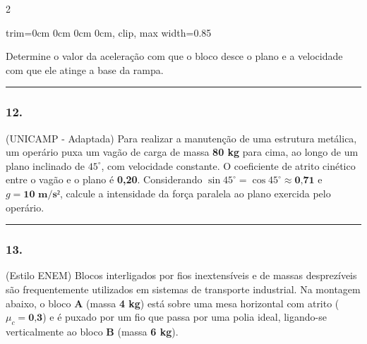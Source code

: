 \documentclass[twoside, 10pt, a4paper]{article}
\newlength{\espacoPreQuestao}\setlength{\espacoPreQuestao}{0.1cm}
\newlength{\espacoQuestao}\setlength{\espacoQuestao}{0.2cm}
\newcommand{\larguraTikz}{0.85\linewidth}
\begin{document}
\begin{multicols*}{2}
\begin{center}
\begin{adjustbox}{trim=0cm 0cm 0cm 0cm, clip, max width=\larguraTikz}
\end{adjustbox}
\end{center}

Determine o valor da aceleração com que o bloco desce o plano e a velocidade com que ele atinge a base da rampa.
\par\vspace{\espacoQuestao}

\noindent\textcolor{CorLinha}{\rule{\linewidth}{0.5pt}} 
\par\vspace{\espacoPreQuestao}
\subsubsection*{12.} (UNICAMP - Adaptada) Para realizar a manutenção de uma estrutura metálica, um operário puxa um vagão de carga de massa \textbf{80 kg} para cima, ao longo de um plano inclinado de $45^\circ$, com velocidade constante. O coeficiente de atrito cinético entre o vagão e o plano é \textbf{0,20}. Considerando $\sin 45^\circ = \cos 45^\circ \approx \textbf{0,71}$ e $g = \textbf{10 m/s²}$, calcule a intensidade da força paralela ao plano exercida pelo operário.
\par\vspace{\espacoQuestao}

\noindent\textcolor{CorLinha}{\rule{\linewidth}{0.5pt}} 
\par\vspace{\espacoPreQuestao}
\subsubsection*{13.} (Estilo ENEM) Blocos interligados por fios inextensíveis e de massas desprezíveis são frequentemente utilizados em sistemas de transporte industrial. Na montagem abaixo, o bloco \textbf{A} (massa \textbf{4 kg}) está sobre uma mesa horizontal com atrito ($\mu_c = \textbf{0,3}$) e é puxado por um fio que passa por uma polia ideal, ligando-se verticalmente ao bloco \textbf{B} (massa \textbf{6 kg}).


\end{multicols*}
\end{document}
